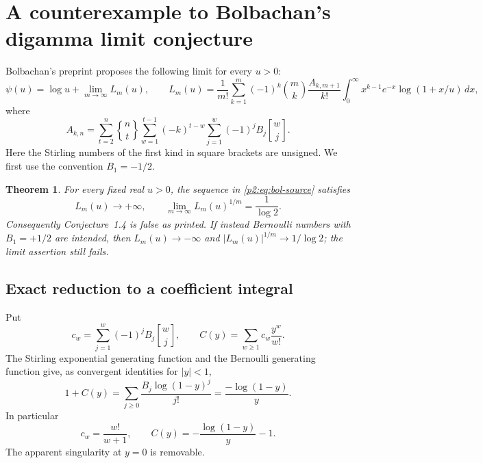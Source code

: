 \documentclass[11pt,a4paper]{article}
\newtheorem{theorem}{Theorem}[section]
\theoremstyle{definition}
\theoremstyle{remark}
\numberwithin{equation}{section}
\begin{document}
\section{A counterexample to Bolbachan's digamma limit conjecture}
\label{p2:sec:bolbachan-counterexample}

Bolbachan's preprint \cite[Conjecture~1.4]{p2:Bolbachan2011}
proposes the following limit for every $u>0$:
\begin{equation}\label{p2:eq:bol-source}
 \psi(u)=\log u+\lim_{m\to\infty} L_m(u),\qquad
 L_m(u)=\frac1{m!}\sum_{k=1}^m(-1)^k\binom mk
 \frac{A_{k,m+1}}{k!}
 \int_0^\infty x^{k-1}e^{-x}\log(1+x/u)\,dx,
\end{equation}
where
\[
 A_{k,n}=\sum_{t=2}^n\genfrac{\{}{\}}{0pt}{}{n}{t}
 \sum_{w=1}^{t-1}(-k)^{t-w}
 \sum_{j=1}^w(-1)^j B_j\genfrac{[}{]}{0pt}{}{w}{j}.
\]
Here the Stirling numbers of the first kind in square brackets are
unsigned.  We first use the convention $B_1=-1/2$.

\begin{theorem}\label{p2:thm:bol-counterexample}
For every fixed real $u>0$, the sequence in \eqref{p2:eq:bol-source}
satisfies
\[
 L_m(u)\longrightarrow+\infty,
 \qquad
 \lim_{m\to\infty}L_m(u)^{1/m}=\frac1{\log2}.
\]
Consequently Conjecture~1.4 is false as printed.  If instead Bernoulli
numbers with $B_1=+1/2$ are intended, then $L_m(u)\to-\infty$ and
$|L_m(u)|^{1/m}\to1/\log2$; the limit assertion still fails.
\end{theorem}

\subsection{Exact reduction to a coefficient integral}
Put
\[
 c_w=\sum_{j=1}^w(-1)^jB_j\genfrac{[}{]}{0pt}{}{w}{j},
 \qquad C(y)=\sum_{w\ge1}c_w\frac{y^w}{w!}.
\]
The Stirling exponential generating function and the Bernoulli generating
function give, as convergent identities for $|y|<1$,
\[
 1+C(y)=\sum_{j\ge0}\frac{B_j\log(1-y)^j}{j!}
 =\frac{-\log(1-y)}{y}.
\]
In particular
\begin{equation}\label{p2:eq:bol-C}
 c_w=\frac{w!}{w+1},\qquad
 C(y)=-\frac{\log(1-y)}{y}-1.
\end{equation}
The apparent singularity at $y=0$ is removable.
\end{document}

